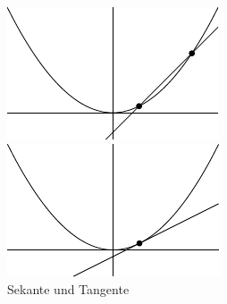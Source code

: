 \documentclass[../main.tex]{subfiles}
\begin{document}
\begin{figure}[htb] 
  \centering
  \begin{minipage}{0.4\textwidth}
    \centering
    \includegraphics{images/derivative1}
  \end{minipage}%
  \begin{minipage}{0.4\textwidth}
    \centering
    \includegraphics{images/derivative2}
  \end{minipage}%
  \caption{Sekante und Tangente}%
  \label{fig:derivative}
\end{figure}
\end{document}
